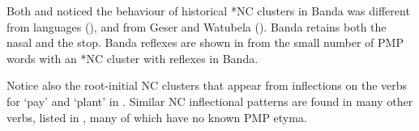 Both \citet{Stresemann1927}
and \citet[133f]{Collins1986} noticed the behaviour of historical
*NC clusters in Banda was different from  languages
(\citeauthor{Stresemann1927}), and from Geser and Watubela (\citeauthor{Collins1986}).
Banda retains both the nasal and the stop.
Banda reflexes are shown in  from the small number
of PMP words with an *NC cluster with reflexes in Banda.


Notice also the root-initial NC clusters that appear from inflections
on the verbs for ‘pay’
and ‘plant’ in .
Similar NC inflectional patterns are found in many other verbs,
listed in , many of which have no known PMP etyma.


